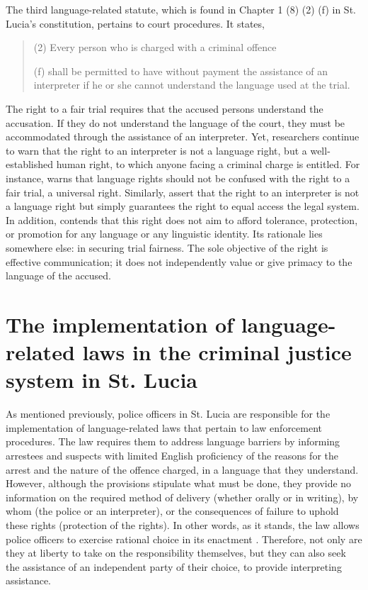 \documentclass[output=paper,colorlinks,citecolor=brown]{langscibook}
\begin{document}
The third language-related statute, which is found in Chapter 1 (8) (2) (f) in St. Lucia’s constitution, pertains to court procedures. It states,

\begin{quote}
    (2) Every person who is charged with a criminal offence
    
    (f) shall be permitted to have without payment the assistance of an interpreter if he or she cannot understand the language used at the trial. 
\end{quote}

The right to a fair trial requires that the accused persons understand the accusation. If they do not understand the language of the court, they must be accommodated through the assistance of an interpreter. Yet, researchers continue to warn that the right to an interpreter is not a language right, but a well-established human right, to which anyone facing a criminal charge is entitled. For instance, \citet[385]{Lubbe2009} warns that language rights should not be confused with the right to a fair trial, a universal right. Similarly, \citet{GonzalesGonzalesMikkelson1991} assert that the right to an interpreter is not a language right but simply guarantees the right to equal access the legal system. In addition, \citet[5]{Arzoz2007} contends that this right does not aim to afford tolerance, protection, or promotion for any language or any linguistic identity. Its rationale lies somewhere else: in securing trial fairness. The sole objective of the right is effective communication; it does not independently value \citep[5]{Arzoz2007} or give primacy to the language of the accused. 


\section{The implementation of language-related laws in the criminal justice system in St. Lucia}

As mentioned previously, police officers in St. Lucia are responsible for the implementation of language-related laws that pertain to law enforcement procedures. The law requires them to address language barriers by informing arrestees and suspects with limited English proficiency of the reasons for the arrest and the nature of the offence charged, in a language that they understand. However, although the provisions stipulate what must be done, they provide no information on the required method of delivery (whether orally or in writing), by whom (the police or an interpreter), or the consequences of failure to uphold these rights (protection of the rights). In other words, as it stands, the law allows police officers to exercise rational choice in its enactment \citep{Evans2019}. Therefore, not only are they at liberty to take on the responsibility themselves, but they can also seek the assistance of an independent party of their choice, to provide interpreting assistance. 
\end{document}
